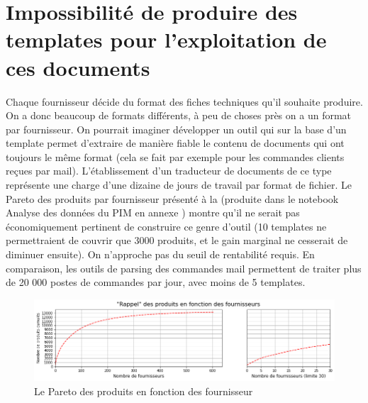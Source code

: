         
        \section{Impossibilité de produire des templates pour l'exploitation de ces documents}

        Chaque fournisseur décide du format des fiches techniques qu'il souhaite produire.
        On a donc beaucoup de formats différents, à peu de choses près on a un format par fournisseur.
        On pourrait imaginer développer un outil qui sur la base d'un template permet d'extraire de manière fiable le contenu de documents qui ont toujours le même format (cela se fait par exemple pour les commandes clients reçues par mail).
        L'établissement d'un \og traducteur \fg de documents de ce type représente une charge d'une dizaine de jours de travail par format de fichier.
        Le Pareto des produits par fournisseur présenté à la  (produite dans le notebook \og Analyse des données du PIM \fg en annexe ) montre qu'il ne serait pas économiquement pertinent de construire ce genre d'outil (10 templates ne permettraient de couvrir que 3000 produits, et le gain marginal ne cesserait de diminuer ensuite).
        On n'approche pas du seuil de rentabilité requis. 
        En comparaison, les outils de parsing des commandes mail permettent de traiter plus de 20 000 postes de commandes par jour, avec moins de 5 templates.

        \begin{figure}[htbp]
            \begin{center}
            \includegraphics[width=\linewidth]{img/rappel_produit_par_fournisseur.png}
            \end{center}
            \caption{Le Pareto des produits en fonction des fournisseur}
            \label{fig:rappel_pdt_par_frn}
        \end{figure}


